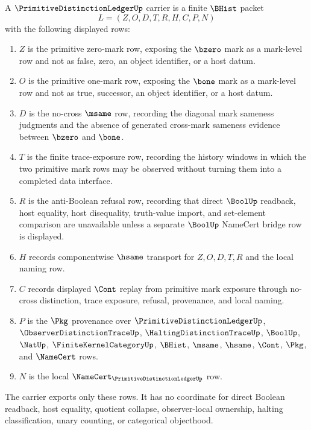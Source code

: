 \begin{definition}
\label{def:primitive-distinction-ledger-carrier}
A $\PrimitiveDistinctionLedgerUp$ carrier is a finite $\BHist$ packet
$$
L=(Z,O,D,T,R,H,C,P,N)
$$
with the following displayed rows:
\begin{enumerate}
\item $Z$ is the primitive zero-mark row, exposing the $\bzero$ mark as a mark-level row and not as false, zero, an object identifier, or a host datum.
\item $O$ is the primitive one-mark row, exposing the $\bone$ mark as a mark-level row and not as true, successor, an object identifier, or a host datum.
\item $D$ is the no-cross $\msame$ row, recording the diagonal mark sameness judgments and the absence of generated cross-mark sameness evidence between $\bzero$ and $\bone$.
\item $T$ is the finite trace-exposure row, recording the history windows in which the two primitive mark rows may be observed without turning them into a completed data interface.
\item $R$ is the anti-Boolean refusal row, recording that direct $\BoolUp$ readback, host equality, host disequality, truth-value import, and set-element comparison are unavailable unless a separate $\BoolUp$ NameCert bridge row is displayed.
\item $H$ records componentwise $\hsame$ transport for $Z,O,D,T,R$ and the local naming row.
\item $C$ records displayed $\Cont$ replay from primitive mark exposure through no-cross distinction, trace exposure, refusal, provenance, and local naming.
\item $P$ is the $\Pkg$ provenance over $\PrimitiveDistinctionLedgerUp$, $\ObserverDistinctionTraceUp$, $\HaltingDistinctionTraceUp$, $\BoolUp$, $\NatUp$, $\FiniteKernelCategoryUp$, $\BHist$, $\msame$, $\hsame$, $\Cont$, $\Pkg$, and $\NameCert$ rows.
\item $N$ is the local $\NameCert_{\PrimitiveDistinctionLedgerUp}$ row.
\end{enumerate}
The carrier exports only these rows. It has no coordinate for direct Boolean readback, host equality, quotient collapse, observer-local ownership, halting classification, unary counting, or categorical objecthood.
\end{definition}

